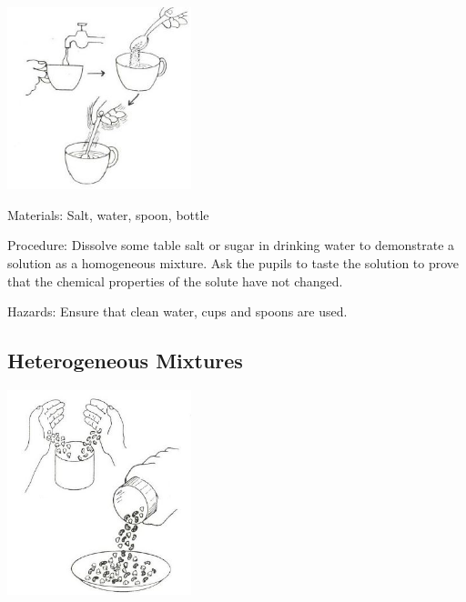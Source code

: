 \begin{multicols}{2}
\begin{center}
\includegraphics[width=0.4\textwidth]{./img/source/homogeneous.jpg}
\end{center}

\begin{description*}
\item[Materials:]{Salt, water, spoon, bottle}
\item[Procedure:]{Dissolve some table salt or sugar in drinking
water to demonstrate a solution as a
homogeneous mixture. Ask the pupils to taste
the solution to prove that the chemical properties
of the solute have not changed.}
\item[Hazards:]{Ensure that clean water, cups and spoons
are used.}
\end{description*}

\subsection{Heterogeneous Mixtures}

\begin{center}
\includegraphics[width=0.4\textwidth]{./img/source/heterogeneous.jpg}
\end{center}


\end{multicols}
